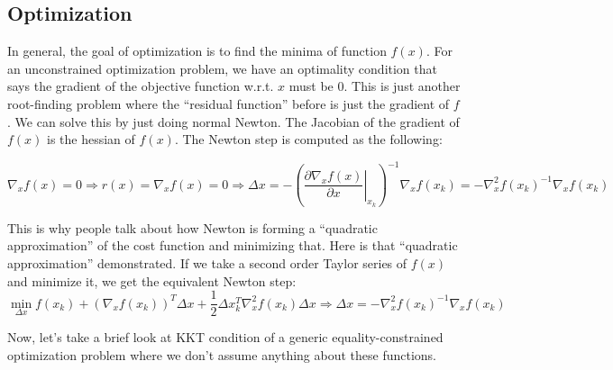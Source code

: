 \subsection{Optimization}
In general, the goal of optimization is to find the minima of function $f(x)$. For an unconstrained optimization problem, we have an optimality condition that says the gradient of the objective function w.r.t. $x$ must be $0$. This is just another root-finding problem where the ``residual function'' before is just the gradient of $f$. We can solve this by just doing normal Newton. The Jacobian of the gradient of $f(x)$ is the hessian of $f(x)$. The Newton step is computed as the following:

\begin{equation}
    \nabla _{x} f( x) =0\Rightarrow r( x) =\nabla _{x} f( x) =0\Rightarrow \Delta x=-\left(\left. \frac{\partial \nabla _{x} f( x)}{\partial x}\right| _{x_{k}}\right)^{-1} \nabla _{x} f( x_{k}) =-\nabla _{x}^{2} f( x_{k})^{-1} \nabla _{x} f( x_{k})
\end{equation}

This is why people talk about how Newton is forming a ``quadratic approximation'' of the cost function and minimizing that. Here is that ``quadratic approximation'' demonstrated.  If we take a second order Taylor series of $f(x)$ and minimize it, we get the equivalent Newton step:
\begin{equation}
    \min_{\Delta x} f( x_{k}) +( \nabla _{x} f( x_{k}))^{T} \Delta x+\frac{1}{2} \Delta x_{k}^{T} \nabla _{x}^{2} f( x_{k}) \Delta x\Rightarrow \Delta x=-\nabla _{x}^{2} f( x_{k})^{-1} \nabla _{x} f( x_{k})
\end{equation}

Now, let's take a brief look at KKT condition of a generic equality-constrained optimization problem where we don't assume anything about these functions.

